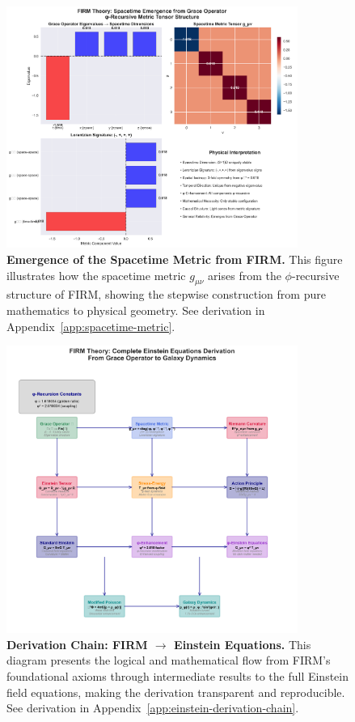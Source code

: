 \documentclass[12pt]{article}
\begin{document}
\begin{figure}[ht]
    \centering
    \includegraphics[width=0.85\textwidth]{figures/spacetime_metric_emergence.png}
    \caption{
        \textbf{Emergence of the Spacetime Metric from FIRM.}
        This figure illustrates how the spacetime metric $g_{\mu\nu}$ arises from the $\phi$-recursive structure of FIRM, showing the stepwise construction from pure mathematics to physical geometry.
        See derivation in Appendix~\ref{app:spacetime-metric}.
    }
    \label{fig:spacetime_metric_emergence}
\end{figure}

\begin{figure}[ht]
    \centering
    \includegraphics[width=0.85\textwidth]{figures/einstein_equations_derivation_chain.png}
    \caption{
        \textbf{Derivation Chain: FIRM $\rightarrow$ Einstein Equations.}
        This diagram presents the logical and mathematical flow from FIRM's foundational axioms through intermediate results to the full Einstein field equations, making the derivation transparent and reproducible.
        See derivation in Appendix~\ref{app:einstein-derivation-chain}.
    }
    \label{fig:einstein_equations_derivation_chain}
\end{figure}
\end{document}
